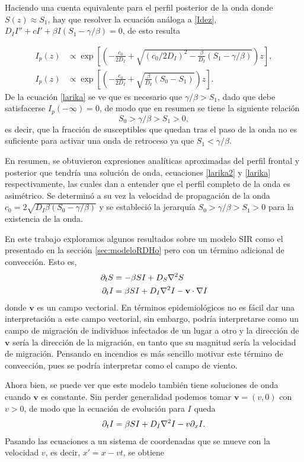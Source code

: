 Haciendo una cuenta equivalente para el perfil posterior de la onda donde $S(z)\approx S_1$, hay que resolver la ecuación análoga a \ref{Idez}, 
$D_I I'' + cI'+\beta I(S_1-\gamma/\beta)=0$, de esto resulta 

\begin{align}
  I_p(z)&\propto \exp[\left(-\frac{c_0}{2D_I}+\sqrt{(c_0/2D_I)^2-\frac{\beta}{D_I}(S_1-\gamma/\beta)}\right)z], \label{larika} \\[.3cm]
  I_p(z)&\propto \exp[\left(-\frac{c_0}{2D_I}+ \sqrt{\frac{\beta}{D_I}(S_0-S_1)}\right)z].
\end{align}
De la ecuación \ref{larika} se ve que es necesario que $\gamma/\beta>S_1$, dado que debe satisfacerse $I_p(-\infty) = 0$, de modo que en resumen se tiene la siguiente relación
\[S_0>\gamma/\beta>S_1>0,\]
es decir, que la fracción de susceptibles que quedan tras el paso de la onda no es suficiente para activar una onda de retroceso ya que $S_1<\gamma/\beta$.

En resumen, se obtuvieron expresiones analíticas aproximadas del perfil frontal y posterior que tendría una solución de onda, ecuaciones \ref{larika2} 
y \ref{larika} respectivamente, las cuales dan a entender que el perfil completo de la onda es asimétrico. Se determinó a su vez la velocidad de propagación de la onda $c_0=2\sqrt{D_I\beta(S_0-\gamma/\beta)}$ y se estableció la 
jerarquía $S_0>\gamma/\beta>S_1>0$ para la existencia de la onda.


En este trabajo exploramos algunos resultados sobre un modelo SIR como el presentado en la sección \ref{sec:modeloRDHo} pero con un término adicional de convección. Esto es,
\begin{align}
  \partial_t S & = -\beta SI + D_S \laplacian{S} \\
  \partial_t I &= \beta SI + D_I \laplacian{I}- \mathbf{v} \cdot \nabla I
\end{align}
donde $\mathbf{v}$ es un campo vectorial. En términos epidemiológicos no es fácil dar una interpretación a este campo vectorial, sin embargo, podría interpretarse 
como un campo de migración de individuos infectados de un lugar a otro y la dirección de $\mathbf{v}$ sería la dirección de la migración, en tanto que su magnitud 
sería la velocidad de migración. Pensando en incendios es más sencillo motivar este término de convección, pues se podría interpretar como el campo de viento. 

Ahora bien, se puede ver que este modelo también tiene soluciones de onda cuando $\mathbf{v}$ es constante. Sin perder generalidad podemos tomar $\mathbf{v}=(v,0)$ con 
$v>0$, de modo que la ecuación de evolución para $I$ queda
\begin{equation}
  \partial_t I = \beta SI + D_I \laplacian{I}- v \partial_x I.
\end{equation}
Pasando las ecuaciones a un sistema de coordenadas que se mueve con la velocidad $v$, es decir, $x'=x-vt$, se obtiene 

